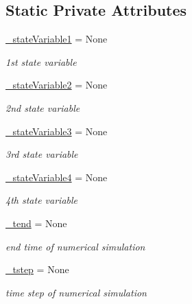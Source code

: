 \subsection*{Static Private Attributes}
\begin{DoxyCompactItemize}
\item 
\hyperlink{class_mu_mo_t_1_1_mu_mo_t_1_1_mu_mo_ttime_evolution_view_aa14fa36730691becc6f3136899545416}{\+\_\+state\+Variable1} = None
\begin{DoxyCompactList}\small\item\em 1st state variable \end{DoxyCompactList}\item 
\hyperlink{class_mu_mo_t_1_1_mu_mo_t_1_1_mu_mo_ttime_evolution_view_a9d3705d1d9182e10751ff693573d6d16}{\+\_\+state\+Variable2} = None
\begin{DoxyCompactList}\small\item\em 2nd state variable \end{DoxyCompactList}\item 
\hyperlink{class_mu_mo_t_1_1_mu_mo_t_1_1_mu_mo_ttime_evolution_view_ad2f8dc44173a16468bd9d3ab335f9b27}{\+\_\+state\+Variable3} = None
\begin{DoxyCompactList}\small\item\em 3rd state variable \end{DoxyCompactList}\item 
\hyperlink{class_mu_mo_t_1_1_mu_mo_t_1_1_mu_mo_ttime_evolution_view_a058e698cd8f7e6b6f6decd99046629a3}{\+\_\+state\+Variable4} = None
\begin{DoxyCompactList}\small\item\em 4th state variable \end{DoxyCompactList}\item 
\hyperlink{class_mu_mo_t_1_1_mu_mo_t_1_1_mu_mo_ttime_evolution_view_a27ad71f8ed3d77fd75946e5b092a228e}{\+\_\+tend} = None
\begin{DoxyCompactList}\small\item\em end time of numerical simulation \end{DoxyCompactList}\item 
\hyperlink{class_mu_mo_t_1_1_mu_mo_t_1_1_mu_mo_ttime_evolution_view_a944ca51d66346a527aa4c8938ccfbfec}{\+\_\+tstep} = None
\begin{DoxyCompactList}\small\item\em time step of numerical simulation \end{DoxyCompactList}\end{DoxyCompactItemize}
